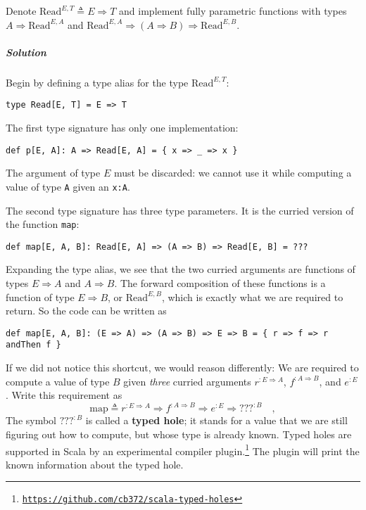 Denote $\text{Read}^{E,T}\triangleq E\Rightarrow T$ and implement
fully parametric functions with types $A\Rightarrow\text{Read}^{E,A}$
and $\text{Read}^{E,A}\Rightarrow(A\Rightarrow B)\Rightarrow\text{Read}^{E,B}$.

\subparagraph{Solution}

Begin by defining a type alias for the type $\text{Read}^{E,T}$:
\begin{lstlisting}
type Read[E, T] = E => T
\end{lstlisting}
The first type signature has only one implementation:
\begin{lstlisting}
def p[E, A]: A => Read[E, A] = { x => _ => x }
\end{lstlisting}
The argument of type $E$ must be discarded: we cannot use it while
computing a value of type \lstinline!A! given an \lstinline!x:A!.

The second type signature has three type parameters. It is the curried
version of the function \lstinline!map!:
\begin{lstlisting}
def map[E, A, B]: Read[E, A] => (A => B) => Read[E, B] = ???
\end{lstlisting}
Expanding the type alias, we see that the two curried arguments are
functions of types $E\Rightarrow A$ and $A\Rightarrow B$. The forward
composition of these functions is a function of type $E\Rightarrow B$,
or $\text{Read}^{E,B}$, which is exactly what we are required to
return. So the code can be written as

\begin{lstlisting}
def map[E, A, B]: (E => A) => (A => B) => E => B = { r => f => r andThen f }
\end{lstlisting}
If we did not notice this shortcut, we would reason differently: We
are required to compute a value of type $B$ given \emph{three} curried
arguments $r^{:E\Rightarrow A}$, $f^{:A\Rightarrow B}$, and $e^{:E}$.
Write this requirement as
\[
\text{map}\triangleq r^{:E\Rightarrow A}\Rightarrow f^{:A\Rightarrow B}\Rightarrow e^{:E}\Rightarrow???^{:B}\quad,
\]
The symbol $\text{???}^{:B}$ is called a \textbf{typed
hole}; it stands for a value that we are still figuring out how to
compute, but whose type is already known. Typed holes are supported
in Scala by an experimental compiler plugin.\footnote{\texttt{\href{https://github.com/cb372/scala-typed-holes}{https://github.com/cb372/scala-typed-holes}}}
The plugin will print the known information about the typed hole.

